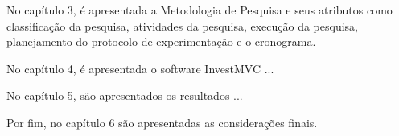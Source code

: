 No capítulo 3, é apresentada a Metodologia de Pesquisa e seus atributos como classificação da pesquisa, atividades da pesquisa, execução da pesquisa, planejamento do protocolo de experimentação e o cronograma.

No capítulo 4, é apresentada o software InvestMVC ...

No capítulo 5, são apresentados os resultados ...

Por fim, no capítulo 6 são apresentadas as considerações finais.
